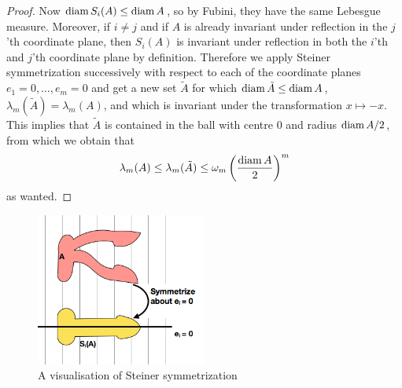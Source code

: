 \begin{proof}
Now $\operatorname{diam} S_i(A) \le \operatorname{diam} A$, so by Fubini, they have the same Lebesgue measure. Moreover, if $i \neq j$ and if $A$ is already invariant under reflection in the $j$'th coordinate plane, then $S_i(A)$ is invariant under reflection in both the $i$'th and $j$'th coordinate plane by definition. Therefore we apply Steiner symmetrization successively with respect to each of the coordinate planes $e_1=0, \dots, e_m=0$ and get a new set $\tilde A$ for which $\operatorname{diam}\tilde A \le \operatorname{diam} A$, $\lambda_m(\tilde A) = \lambda_m(A)$, and which is invariant under the transformation $x \mapsto -x$. This implies that $\tilde A$ is contained in the ball with centre 0 and radius $\operatorname{diam} A/2$, from which we obtain that
\[
    \lambda_m(A) \le \lambda_m(\tilde A) \le \omega_m \left(\frac{\operatorname{diam} A}{2}\right)^m
\]
as wanted.
\end{proof}

\begin{figure}[h]
  \centering
    \includegraphics[width=0.5\textwidth]{images/steiner.png}
    \caption{A visualisation of Steiner symmetrization}
    \label{fig: steiner}
\end{figure}

